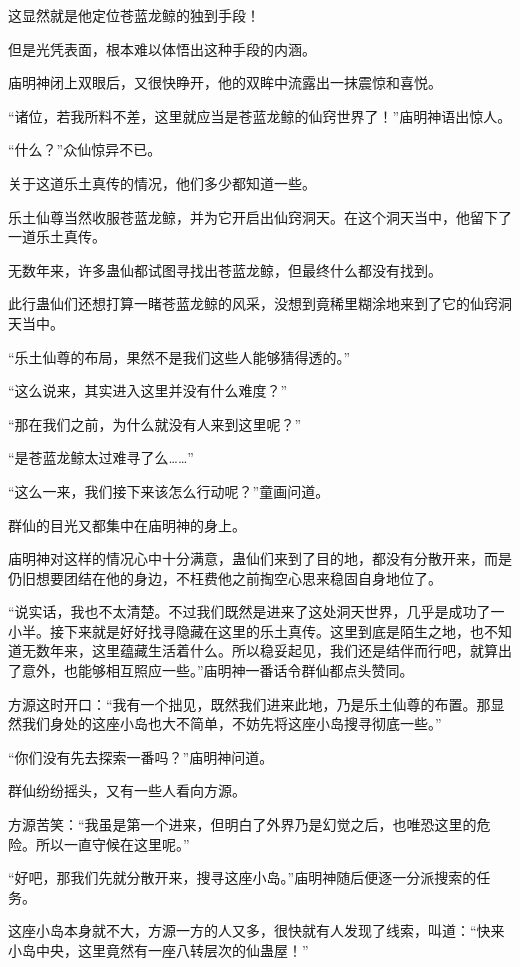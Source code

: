 \begin{this_body}
这显然就是他定位苍蓝龙鲸的独到手段！

但是光凭表面，根本难以体悟出这种手段的内涵。

庙明神闭上双眼后，又很快睁开，他的双眸中流露出一抹震惊和喜悦。

“诸位，若我所料不差，这里就应当是苍蓝龙鲸的仙窍世界了！”庙明神语出惊人。

“什么？”众仙惊异不已。

关于这道乐土真传的情况，他们多少都知道一些。

乐土仙尊当然收服苍蓝龙鲸，并为它开启出仙窍洞天。在这个洞天当中，他留下了一道乐土真传。

无数年来，许多蛊仙都试图寻找出苍蓝龙鲸，但最终什么都没有找到。

此行蛊仙们还想打算一睹苍蓝龙鲸的风采，没想到竟稀里糊涂地来到了它的仙窍洞天当中。

“乐土仙尊的布局，果然不是我们这些人能够猜得透的。”

“这么说来，其实进入这里并没有什么难度？”

“那在我们之前，为什么就没有人来到这里呢？”

“是苍蓝龙鲸太过难寻了么……”

“这么一来，我们接下来该怎么行动呢？”童画问道。

群仙的目光又都集中在庙明神的身上。

庙明神对这样的情况心中十分满意，蛊仙们来到了目的地，都没有分散开来，而是仍旧想要团结在他的身边，不枉费他之前掏空心思来稳固自身地位了。

“说实话，我也不太清楚。不过我们既然是进来了这处洞天世界，几乎是成功了一小半。接下来就是好好找寻隐藏在这里的乐土真传。这里到底是陌生之地，也不知道无数年来，这里蕴藏生活着什么。所以稳妥起见，我们还是结伴而行吧，就算出了意外，也能够相互照应一些。”庙明神一番话令群仙都点头赞同。

方源这时开口：“我有一个拙见，既然我们进来此地，乃是乐土仙尊的布置。那显然我们身处的这座小岛也大不简单，不妨先将这座小岛搜寻彻底一些。”

“你们没有先去探索一番吗？”庙明神问道。

群仙纷纷摇头，又有一些人看向方源。

方源苦笑：“我虽是第一个进来，但明白了外界乃是幻觉之后，也唯恐这里的危险。所以一直守候在这里呢。”

“好吧，那我们先就分散开来，搜寻这座小岛。”庙明神随后便逐一分派搜索的任务。

这座小岛本身就不大，方源一方的人又多，很快就有人发现了线索，叫道：“快来小岛中央，这里竟然有一座八转层次的仙蛊屋！”


\end{this_body}

